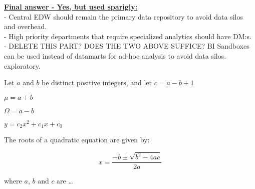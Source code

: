 \textbf{\underline{Final answer - Yes, but used sparigly:}}\\
- Central EDW should remain the primary data repository to avoid data silos and overhead.\\
- High priority departments that require specialized analytics should have DM:s.\\
- {\color{red} DELETE THIS PART? DOES THE TWO ABOVE SUFFICE?} BI Sandboxes can be used instead of datamarts for ad-hoc analysis to avoid data silos.
exploratory.

\newpage 
Let $a$ and $b$ be distinct positive integers, and let $c = a - b + 1$

$\mu = a + b $


$\Omega = a - b $

$y = c_2 x^2 + c_1 x + c_0 $

The roots of a quadratic equation are given by:

\begin{equation}
x = \frac{-b \pm \sqrt{b^2 - 4ac}} {2a}
\end{equation}

where $a$, $b$ and $c$ are \ldots
